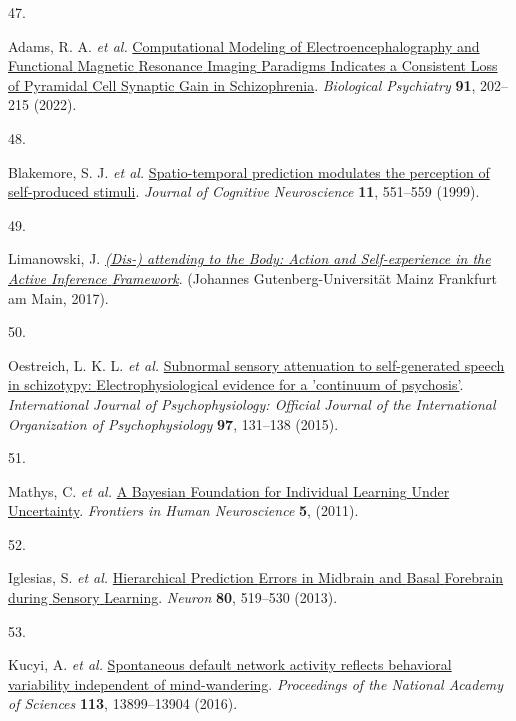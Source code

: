 \documentclass[
]{article}
\newlength{\cslhangindent}
\newlength{\csllabelwidth}
\newenvironment{CSLReferences}[2] %
 {\begin{list}{}{%
  \setlength{\itemindent}{0pt}
  \setlength{\leftmargin}{0pt}
  \setlength{\parsep}{0pt}
  \ifodd #1
   \setlength{\leftmargin}{\cslhangindent}
   \setlength{\itemindent}{-1\cslhangindent}
  \fi
  \setlength{\itemsep}{#2\baselineskip}}}
 {\end{list}}
\newcommand{\CSLLeftMargin}[1]{\parbox[t]{\csllabelwidth}{\strut#1\strut}}
\newcommand{\CSLRightInline}[1]{\parbox[t]{\linewidth - \csllabelwidth}{\strut#1\strut}}
\begin{document}
\begin{CSLReferences}{0}{0}
\CSLLeftMargin{47. }%
\CSLRightInline{Adams, R. A. \emph{et al.}
\href{https://doi.org/10.1016/j.biopsych.2021.07.024}{Computational
{Modeling} of {Electroencephalography} and {Functional} {Magnetic}
{Resonance} {Imaging} {Paradigms} {Indicates} a {Consistent} {Loss} of
{Pyramidal} {Cell} {Synaptic} {Gain} in {Schizophrenia}}.
\emph{Biological Psychiatry} \textbf{91}, 202--215 (2022).}

\CSLLeftMargin{48. }%
\CSLRightInline{Blakemore, S. J. \emph{et al.}
\href{https://doi.org/10.1162/089892999563607}{Spatio-temporal
prediction modulates the perception of self-produced stimuli}.
\emph{Journal of Cognitive Neuroscience} \textbf{11}, 551--559 (1999).}

\CSLLeftMargin{49. }%
\CSLRightInline{Limanowski, J.
\emph{\href{https://openscience.ub.uni-mainz.de/handle/20.500.12030/643}{({Dis}-)
attending to the {Body}: {Action} and {Self}-experience in the {Active}
{Inference} {Framework}}}. (Johannes Gutenberg-Universität Mainz
Frankfurt am Main, 2017).}

\CSLLeftMargin{50. }%
\CSLRightInline{Oestreich, L. K. L. \emph{et al.}
\href{https://doi.org/10.1016/j.ijpsycho.2015.05.014}{Subnormal sensory
attenuation to self-generated speech in schizotypy:
{Electrophysiological} evidence for a 'continuum of psychosis'}.
\emph{International Journal of Psychophysiology: Official Journal of the
International Organization of Psychophysiology} \textbf{97}, 131--138
(2015).}

\CSLLeftMargin{51. }%
\CSLRightInline{Mathys, C. \emph{et al.}
\href{https://doi.org/10.3389/fnhum.2011.00039}{A {Bayesian}
{Foundation} for {Individual} {Learning} {Under} {Uncertainty}}.
\emph{Frontiers in Human Neuroscience} \textbf{5}, (2011).}

\CSLLeftMargin{52. }%
\CSLRightInline{Iglesias, S. \emph{et al.}
\href{https://doi.org/10.1016/j.neuron.2013.09.009}{Hierarchical
{Prediction} {Errors} in {Midbrain} and {Basal} {Forebrain} during
{Sensory} {Learning}}. \emph{Neuron} \textbf{80}, 519--530 (2013).}

\CSLLeftMargin{53. }%
\CSLRightInline{Kucyi, A. \emph{et al.}
\href{https://doi.org/10.1073/pnas.1611743113}{Spontaneous default
network activity reflects behavioral variability independent of
mind-wandering}. \emph{Proceedings of the National Academy of Sciences}
\textbf{113}, 13899--13904 (2016).}


\end{CSLReferences}
\end{document}
